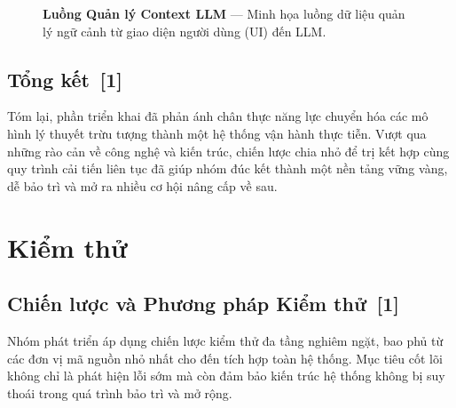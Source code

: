 \documentclass[12pt, a4paper]{article}
\begin{document}
\begin{figure}[H]
    \caption{\textbf{Luồng Quản lý Context LLM} --- Minh họa luồng dữ liệu quản lý ngữ cảnh từ giao diện người dùng (UI) đến LLM.}
    \label{fig:llm_context_flow}
\end{figure}

\subsection[Tổng kết]{Tổng kết \,{\normalfont\small\textcolor{cyan!70!black}{[1]}}}
Tóm lại, phần triển khai đã phản ánh chân thực năng lực chuyển hóa các mô hình lý thuyết trừu tượng thành một hệ thống vận hành thực tiễn. Vượt qua những rào cản về công nghệ và kiến trúc, chiến lược chia nhỏ để trị kết hợp cùng quy trình cải tiến liên tục đã giúp nhóm đúc kết thành một nền tảng vững vàng, dễ bảo trì và mở ra nhiều cơ hội nâng cấp về sau.

\section{Kiểm thử}

\subsection[Chiến lược và Phương pháp Kiểm thử]{Chiến lược và Phương pháp Kiểm thử \,{\normalfont\small\textcolor{cyan!70!black}{[1]}}}
Nhóm phát triển áp dụng chiến lược kiểm thử đa tầng nghiêm ngặt, bao phủ từ các đơn vị mã nguồn nhỏ nhất cho đến tích hợp toàn hệ thống. Mục tiêu cốt lõi không chỉ là phát hiện lỗi sớm mà còn đảm bảo kiến trúc hệ thống không bị suy thoái trong quá trình bảo trì và mở rộng.
\end{document}
